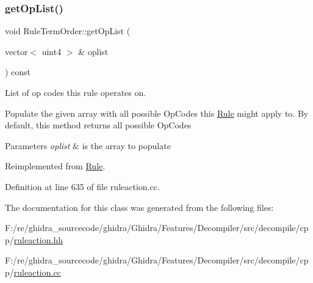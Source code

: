 \subsubsection{\texorpdfstring{getOpList()}{getOpList()}}
{\footnotesize\ttfamily void Rule\+Term\+Order\+::get\+Op\+List (\begin{DoxyParamCaption}\item[{vector$<$ uint4 $>$ \&}]{oplist }\end{DoxyParamCaption}) const\hspace{0.3cm}{\ttfamily [virtual]}}



List of op codes this rule operates on. 

Populate the given array with all possible Op\+Codes this \mbox{\hyperlink{class_rule}{Rule}} might apply to. By default, this method returns all possible Op\+Codes 
\begin{DoxyParams}{Parameters}
{\em oplist} & is the array to populate \\
\hline
\end{DoxyParams}


Reimplemented from \mbox{\hyperlink{class_rule_a4023bfc7825de0ab866790551856d10e}{Rule}}.



Definition at line 635 of file ruleaction.\+cc.



The documentation for this class was generated from the following files\+:\begin{DoxyCompactItemize}
\item 
F\+:/re/ghidra\+\_\+sourcecode/ghidra/\+Ghidra/\+Features/\+Decompiler/src/decompile/cpp/\mbox{\hyperlink{ruleaction_8hh}{ruleaction.\+hh}}\item 
F\+:/re/ghidra\+\_\+sourcecode/ghidra/\+Ghidra/\+Features/\+Decompiler/src/decompile/cpp/\mbox{\hyperlink{ruleaction_8cc}{ruleaction.\+cc}}\end{DoxyCompactItemize}
